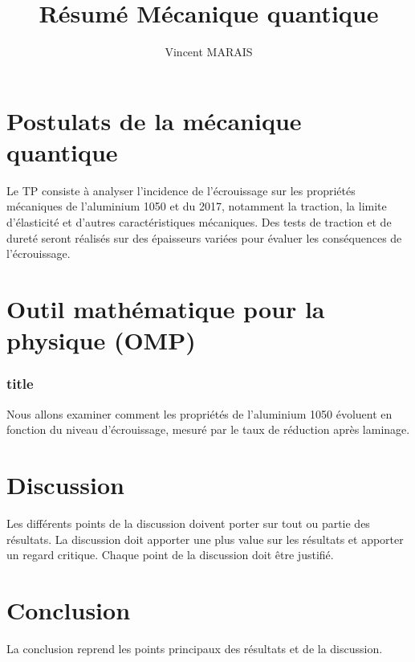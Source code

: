 \documentclass[12pt,a4paper]{article}
\title{Résumé Mécanique quantique}
\author{\textup{Vincent MARAIS}}
\begin{document}
	
	
	\tableofcontents
\section{Postulats de la mécanique quantique}
	
Le TP consiste à analyser l'incidence de l'écrouissage sur les propriétés mécaniques de l'aluminium 1050 et du 2017, notamment la traction, la limite d'élasticité et d'autres caractéristiques mécaniques. Des tests de traction et de dureté seront réalisés sur des épaisseurs variées pour évaluer les conséquences de l'écrouissage.
	


\section{Outil mathématique pour la physique (OMP)}

\subsubsection{title}
Nous allons examiner comment les propriétés de l'aluminium 1050 évoluent en fonction du niveau d'écrouissage, mesuré par le taux de réduction après laminage.

\vspace{0.2cm}

	


\section{Discussion}	
Les différents points de la discussion doivent porter sur tout ou partie des résultats. La discussion doit apporter une plus value sur les résultats et apporter un regard critique. Chaque point de la discussion doit être justifié.
	
\section{Conclusion}	
La conclusion reprend les points principaux des résultats et de la discussion.
	
\end{document}
